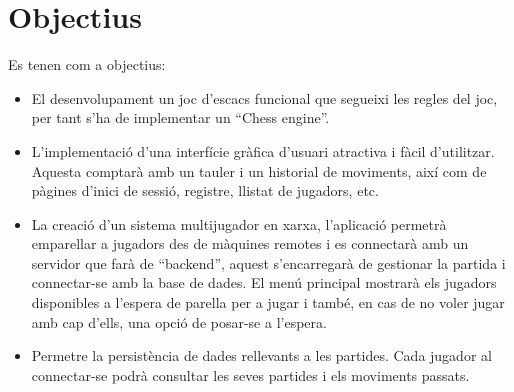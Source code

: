 \section{Objectius}
Es tenen com a objectius:
\begin{itemize}
    \item El desenvolupament un joc d'escacs funcional que segueixi les regles del joc, per tant s’ha de implementar un “Chess engine”.
    \item L’implementació d’una interfície gràfica d'usuari atractiva i fàcil d'utilitzar. Aquesta comptarà amb un tauler i un historial de moviments, així com de pàgines d’inici de sessió, registre, llistat de jugadors, etc.
    \item La creació d’un sistema multijugador en xarxa, l'aplicació permetrà emparellar a jugadors des de màquines remotes i es connectarà amb un servidor que farà de “backend”, aquest s’encarregarà de gestionar la partida i connectar-se amb la base de dades. El menú principal mostrarà els jugadors disponibles a l'espera de parella per a jugar i també, en cas de no voler jugar amb cap d'ells, una opció de posar-se a l'espera.
    \item Permetre la persistència de dades rellevants a les partides. Cada jugador al connectar-se podrà consultar les seves partides i els moviments passats.
\end{itemize}